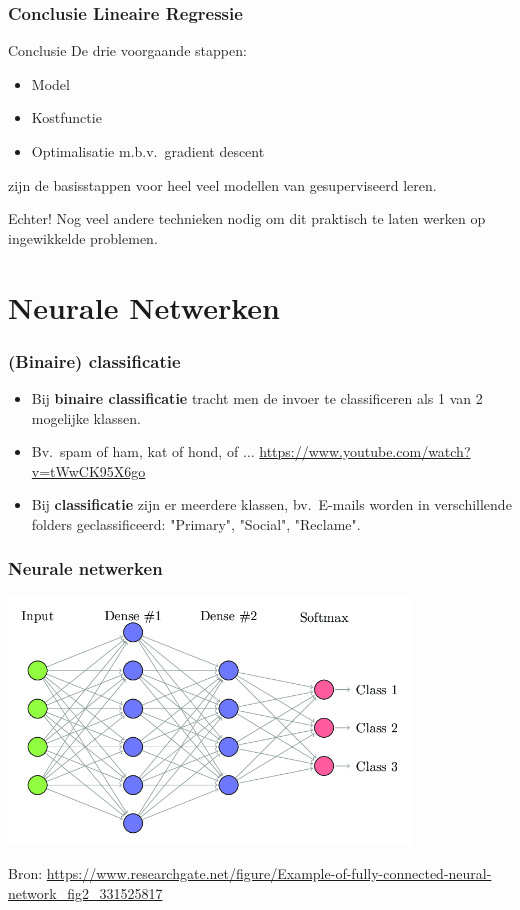 \documentclass[aspectratio=169]{beamer}
\begin{document}
\begin{frame}
\frametitle{Conclusie Lineaire Regressie}

\begin{block}{Conclusie}
	De drie voorgaande stappen:
	\begin{itemize}
		\item Model
		\item Kostfunctie
		\item Optimalisatie m.b.v.\ gradient descent
	\end{itemize}
    zijn de basisstappen voor heel veel modellen van gesuperviseerd leren.
\end{block}

Echter! Nog veel andere technieken nodig om dit praktisch te laten werken op ingewikkelde problemen.

\end{frame}

\section{Neurale Netwerken}


\begin{frame}
	\frametitle{(Binaire) classificatie}
	\begin{itemize}
		\item Bij \textbf{binaire classificatie} tracht men de invoer te classificeren als 1 van 2 mogelijke klassen.
		\item Bv.\ spam of ham, kat of hond, of $\ldots$ \url{https://www.youtube.com/watch?v=tWwCK95X6go}
		\item Bij \textbf{classificatie} zijn er meerdere klassen, bv.\ E-mails worden in verschillende 
		folders geclassificeerd: "Primary", "Social", "Reclame".
	\end{itemize}
\end{frame}

\begin{frame}
\frametitle{Neurale netwerken}

\begin{center}
\includegraphics[width=0.8\textwidth]{graphics/fully-connected-neural-network}
\end{center}

\tiny{Bron: \url{https://www.researchgate.net/figure/Example-of-fully-connected-neural-network_fig2_331525817}} 
\end{frame}
\end{document}
